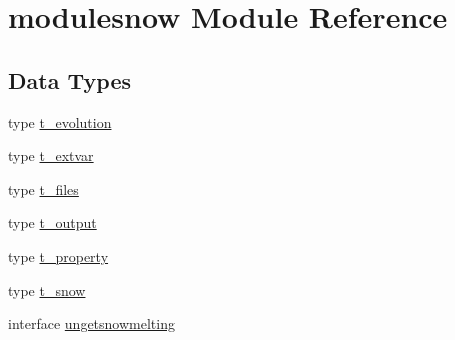 \hypertarget{namespacemodulesnow}{}\section{modulesnow Module Reference}
\label{namespacemodulesnow}
\subsection*{Data Types}
\begin{DoxyCompactItemize}
\item 
type \mbox{\hyperlink{structmodulesnow_1_1t__evolution}{t\+\_\+evolution}}
\item 
type \mbox{\hyperlink{structmodulesnow_1_1t__extvar}{t\+\_\+extvar}}
\item 
type \mbox{\hyperlink{structmodulesnow_1_1t__files}{t\+\_\+files}}
\item 
type \mbox{\hyperlink{structmodulesnow_1_1t__output}{t\+\_\+output}}
\item 
type \mbox{\hyperlink{structmodulesnow_1_1t__property}{t\+\_\+property}}
\item 
type \mbox{\hyperlink{structmodulesnow_1_1t__snow}{t\+\_\+snow}}
\item 
interface \mbox{\hyperlink{interfacemodulesnow_1_1ungetsnowmelting}{ungetsnowmelting}}
\end{DoxyCompactItemize}
